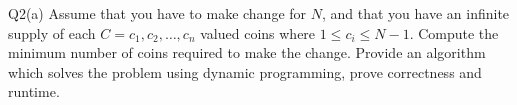 \begin{problem}
  {Q2(a)}
  Assume that you have to make change for $N$, and that you have an infinite supply of each $C = c_1, c_2, \dots, c_n$ valued coins where $1 \leq c_i \leq N-1$.
  Compute the minimum number of coins required to make the change. Provide an algorithm which solves the problem using dynamic programming, prove correctness and runtime.
\end{problem}
